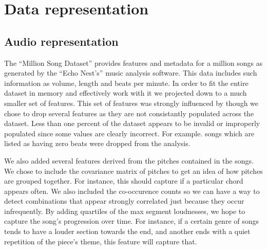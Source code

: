 \documentclass[a4paper,10pt]{article}
\begin{document}
\section{Data representation}
\subsection{Audio representation}
The ``Million Song Dataset'' provides features and metadata for a million songs as generated by the ``Echo Nest's'' music analysis software. This data includes such information as volume, length and beats per minute. In order to fit the entire dataset in memory and effectively work with it we projected down to a much smaller set of features. This set of features was strongly influenced by \cite{Slaney_learninga} though we chose to drop several features as they are not consistantly populated across the dataset. Less than one percent of the dataset appears to be invalid or improperly populated since some values are clearly incorrect. For example. songs which are listed as having zero beats were dropped from the analysis. 

We also added several features derived from the pitches contained in the songs. We chose to include the covariance matrix of pitches to get an idea of how pitches are grouped together. For instance, this should capture if a particular chord appears often. We also included the co-occurence counts so we can have a way to detect combinations that appear strongly correlated just because they occur infrequently. By adding quartiles of the max segment loudnesses, we hope to capture the song's progression over time. For instance, if a certain genre of songs tends to have a louder section towards the end, and another ends with a quiet repetition of the piece's theme, this feature will capture that.
\end{document}

